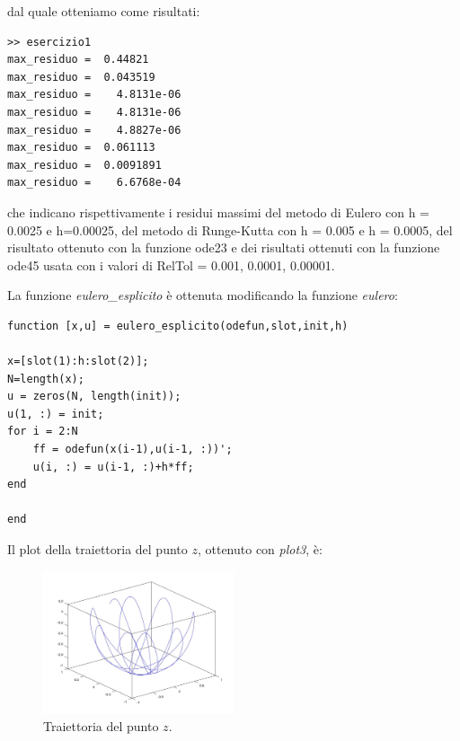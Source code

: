 \documentclass[11pt,a4paper,twoside,openright,titlepage,
headinclude,footinclude,BCOR5mm,
numbers=noenddot,cleardoublepage=empty,
tablecaptionabove]{scrbook}
\begin{document}
dal quale otteniamo come risultati:
\begin{lstlisting}[frame = lines]
>> esercizio1
max_residuo =  0.44821
max_residuo =  0.043519
max_residuo =    4.8131e-06
max_residuo =    4.8131e-06
max_residuo =    4.8827e-06
max_residuo =  0.061113
max_residuo =  0.0091891
max_residuo =    6.6768e-04
\end{lstlisting}
che indicano rispettivamente i residui massimi del metodo di Eulero con 
h = 0.0025 e h=0.00025, del metodo di Runge-Kutta con h = 0.005 e h = 0.0005,
del risultato ottenuto con la funzione ode23 e dei risultati ottenuti con la 
funzione ode45 usata con i valori di RelTol = 0.001, 0.0001, 0.00001.
\par
La funzione \emph{eulero\_esplicito} è ottenuta modificando la funzione 
\emph{eulero}:
\begin{lstlisting}[frame = trBL]
function [x,u] = eulero_esplicito(odefun,slot,init,h)

x=[slot(1):h:slot(2)];
N=length(x);
u = zeros(N, length(init));  
u(1, :) = init;
for i = 2:N
    ff = odefun(x(i-1),u(i-1, :))';
    u(i, :) = u(i-1, :)+h*ff;
end

end
\end{lstlisting}
Il plot della traiettoria del punto $z$, ottenuto con \emph{plot3}, è:
\begin{center}
\begin{figure}[h!]
\includegraphics[width=0.5\textwidth]{figs/esercizio1.jpg}
\caption{Traiettoria del punto $z$.}
\end{figure}
\end{center}
\end{document}
